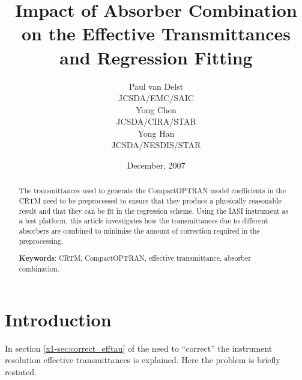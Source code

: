 





\title{Impact of Absorber Combination on the Effective Transmittances and Regression Fitting}
\author{Paul van Delst\\JCSDA/EMC/SAIC\\[0.25in]
        Yong Chen\\JCSDA/CIRA/STAR\\[0.25in]
        Yong Han\\JCSDA/NESDIS/STAR}
\date{December, 2007}




\maketitle

\begin{abstract}
The transmittances used to generate the CompactOPTRAN model coefficients in the CRTM need to be preprocessed to ensure that they produce a physically reasonable result and that they can be fit in the regression scheme. Using the IASI instrument as a test platform, this article investigates how the transmittances due to different absorbers are combined to minimise the amount of correction required in the preprocessing.

\textbf{Keywords}: CRTM, CompactOPTRAN, effective transmittance, absorber combination.
\end{abstract}


\section{Introduction}
In section \ref{x1-sec:correct_efftau} of \cite{ref:crtm_idoc1} the need to ``correct'' the instrument resolution effective transmittances is explained. Here the problem is briefly restated.

